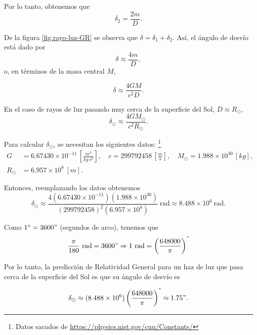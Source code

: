 \documentclass[letterpaper,11pt]{article}
\newcommand{\grad}{^\circ}
\begin{document}
Por lo tanto, obtenemos que
\begin{equation}
\delta_2 = \frac{2m}{D}.
\end{equation}

De la figura \ref{fig:rayo-luz-GR} se observa que $\delta = \delta_1 + \delta_2$. Así, el ángulo de desvío está dado por
\begin{equation}
\delta \approx \frac{4m}{D},
\end{equation}
o, en términos de la masa central $M$,
\begin{shaded}
\begin{equation}\label{eq:desbio-luz}
\delta \approx \frac{4GM}{c^2D}.
\end{equation}
\end{shaded}

En el caso de rayos de luz pasando muy cerca de la superficie del Sol, $D \approx R_{\odot}$, 
\begin{equation}
\delta_{\odot} \approx \frac{4GM_{\odot}}{c^2R_{\odot}}.
\end{equation}

Para calcular $\delta_{\odot}$, se necesitan los siguientes datos: \footnote{Datos sacados de \url{
https://physics.nist.gov/cuu/Constants/}}
\begin{align}
G &= 6.67430 \times 10^{-11} \,\left[ \frac{m^3}{kg \,s^2} \right], \quad  c =  299 792 458 \,\left[ \frac{m}{s}\right], \quad  M_{\odot} = 1.988 \times 10^{30} \,[kg], \\
R_{\odot} &= 6.957 \times 10^{8} \ [m].  
\end{align}

Entonces, reemplazando los datos obtenemos 
\begin{equation}
\delta_{\odot} \approx \frac{4 (6.67430 \times 10^{-11}) (1.988 \times 10^{30})}{(299 792 458)^2 (6.957 \times 10^{8})} \ \text{rad} 
\approx 8.488 \times 10^{6} \ \text{rad}.
\end{equation}

Como $1\grad = 3600"$ (segundos de arco), tenemos que
\begin{equation}
\frac{\pi}{180} \ \text{rad} = 3600" \Rightarrow 1 \ \text{rad} = \left(\frac{648000}{\pi}\right)^{"}
\end{equation}

Por lo tanto, la predicción de Relatividad General para un haz de luz que pasa cerca de la superficie del Sol es que su ángulo de desvío es
\begin{shaded}
\begin{equation}
\delta_{\odot} \approx (8.488 \times 10^{6}) \left( \frac{648000}{\pi}\right)^" \approx 1.75 ". 
\end{equation}
\end{shaded}
\end{document}
